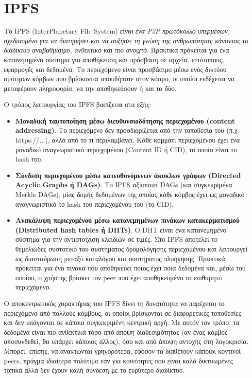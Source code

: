\section{IPFS}

Το IPFS (InterPlanetary File System) είναι \textit{ένα P2P πρωτόκολλο υπερμέσων, σχεδιασμένο για να διατηρήσει και να αυξήσει τη γνώση της ανθρωπότητας κάνοντας το διαδίκτυο αναβαθμίσιμο, ανθεκτικό και πιο ανοιχτό}. %
Πρακτικά πρόκειται για ένα κατανεμημένο σύστημα για αποθήκευση και πρόσβαση σε αρχεία, ιστότοπους, εφαρμογές και δεδομένα. Το περιεχόμενο είναι προσβάσιμο μέσω ενός δικτύου ομότιμων κόμβων που βρίσκονται οπουδήποτε στον κόσμο, οι οποίοι ενδέχεται να μεταφέρουν πληροφορία, να την αποθηκεύσουν ή και τα δύο.  %

Ο τρόπος λειτουργίας του IPFS βασίζεται στα εξής:

\begin{itemize}
	\item \textbf{Μοναδική ταυτοποίηση μέσω διευθυνσιοδότησης περιεχομένου (content addressing)}. Το περιεχόμενο δεν προσδιορίζεται από την τοποθεσία του (π.χ. https://...), αλλά από το τι περιλαμβάνει. Κάθε κομμάτι περιεχομένου έχει ένα μοναδικό αναγνωριστικό περιεχομένου (Content ID ή CID), το οποίο είναι το hash του.
	\item \textbf{Σύνδεση περιεχομένου μέσω κατευθυνόμενων άκυκλων γράφων (Directed Acyclic Graphs ή DAGs)}. Το IPFS αξιοποιεί DAGs (και συγκεκριμένα Merkle DAGs), μίας δομής δεδομένων της οποίας κάθε κόμβος έχει ως μοναδικό αναγνωριστικό το hash του περιεχομένου του (το CID).
	\item \textbf{Ανακάλυψη περιεχομένου μέσω κατανεμημένων πινάκων κατακερματισμού (Distributed hash tables ή DHTs)}. Ο DHT είναι ένα κατανεμημένο σύστημα για την αντιστοίχιση κλειδιών σε τιμές. Στο IPFS αποτελεί το θεμελιώδες συστατικό του συστήματος δρομολόγησης περιεχομένου και λειτουργεί ως διασταύρωση μεταξύ καταλόγου και συστήματος πλοήγησης. Πρακτικά πρόκειται για ένα πίνακα που αποθηκεύει ποιος έχει ποια δεδομένα και, μέσω του οποίου, ο χρήστης βρίσκει τον peer που έχει αποθηκευμένο το επιθυμητό περιεχόμενο.
\end{itemize}

Ο αποκεντρωτικός χαρακτήρας του IPFS δίνει τη δυνατότητα να παρέχεται το περιεχόμενο από πολλούς κόμβους, οι οποίοι βρίσκονται σε διαφορετικές τοποθεσίες και δεν υπάγονται σε κάποια συγκεκριμένη κεντρική αρχή. Με αυτόν τον τρόπο, τα δεδομένα είναι πιο ανθεκτικά τόσο από άποψη διαθεσιμότητας (αν ένας κόμβος αποσυνδεθεί, θα υπάρχει κάποιος άλλος), όσο και από άποψη αντοχής στη λογοκρισία. Μπορεί, επίσης, να ανακτώνται γρηγορότερα, εφόσον τα διαθέτουν κάποιοι κοντινοί peers, πράγμα ιδιαίτερα πολύτιμο εάν για κοινότητες που είναι καλά δικτυωμένες τοπικά αλλά δεν έχουν καλή σύνδεση με το ευρύτερο διαδίκτυο.


